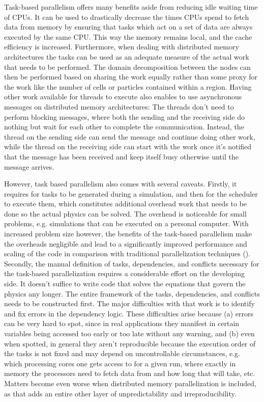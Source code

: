Task-based parallelism offers many benefits aside from reducing idle waiting time of CPUs. It can
be used to drastically decrease the times CPUs spend to fetch data from memory by ensuring that
tasks which act on a set of data are always executed by the same CPU. This way the memory remains
local, and the cache efficiency is increased. Furthermore, when dealing with distributed memory
architectures the tasks can be used as an adequate measure of the actual work that needs to be
performed. The domain decomposition between the nodes can then be performed based on sharing the
work equally rather than some proxy for the work like the number of cells or particles contained
within a region. Having other work available for threads to execute also enables \swift to use
asynchronous messages on distributed memory architectures: The threads don't need to perform
blocking messages, where both the sending and the receiving side do nothing but wait for each other
to complete the communication. Instead, the thread on the sending side can send the message and
continue doing other work, while the thread on the receiving side can start with the work once it's
notified that the message has been received and keep itself busy otherwise until the message
arrives.


However, task based parallelism also comes with several caveats. Firstly, it requires for tasks to
be generated during a simulation, and then for the scheduler to execute them, which constitutes
additional overhead work that needs to be done so the actual physics can be solved. The overhead is
noticeable for small problems, e.g. simulations that can be executed on a personal computer. With
increased problem size however, the benefits of the task-based parallelism make the overheads
negligible and lead to a significantly improved performance and scaling of the code in comparison
with traditional parallelization techniques (\cite{borrowSWIFTMaintainingWeakscalability2018}).
Secondly, the manual definition of tasks, dependencies, and conflicts necessary for the task-based
parallelization requires a considerable effort on the developing side. It doesn't suffice to write
code that solves the equations that govern the physics any longer. The entire framework of the
tasks, dependencies, and conflicts needs to be constructed first. The major difficulties with that
work is to identify and fix errors in the dependency logic. These difficulties arise because (a)
errors can be very hard to spot, since in real applications they manifest in certain variables being
accessed too early or too late without any warning, and (b) even when spotted, in general they
aren't reproducible because the execution order of the tasks is not fixed and may depend on
uncontrollable circumstances, e.g. which processing cores one gets access to for a given run, where
exactly in memory the processors need to fetch data from and how long that will take, etc. Matters
become even worse when distributed memory parallelization is included, as that adds an entire other
layer of unpredictability and irreproducibility.








